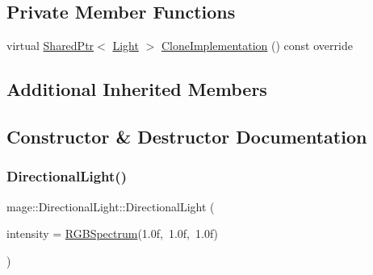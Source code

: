 \subsection*{Private Member Functions}
\begin{DoxyCompactItemize}
\item 
virtual \hyperlink{namespacemage_a1e01ae66713838a7a67d30e44c67703e}{Shared\+Ptr}$<$ \hyperlink{classmage_1_1_light}{Light} $>$ \hyperlink{classmage_1_1_directional_light_a4745c6c9424a427d5d1efaf8530cbb63}{Clone\+Implementation} () const override
\end{DoxyCompactItemize}
\subsection*{Additional Inherited Members}


\subsection{Constructor \& Destructor Documentation}
\hypertarget{classmage_1_1_directional_light_a67df04219f61a8350045e5743b1de284}{}\label{classmage_1_1_directional_light_a67df04219f61a8350045e5743b1de284} 
\subsubsection{\texorpdfstring{Directional\+Light()}{DirectionalLight()}\hspace{0.1cm}{\footnotesize\ttfamily [1/3]}}
{\footnotesize\ttfamily mage\+::\+Directional\+Light\+::\+Directional\+Light (\begin{DoxyParamCaption}\item[{const \hyperlink{structmage_1_1_r_g_b_spectrum}{R\+G\+B\+Spectrum} \&}]{intensity = {\ttfamily \hyperlink{structmage_1_1_r_g_b_spectrum}{R\+G\+B\+Spectrum}(1.0f,~1.0f,~1.0f)} }\end{DoxyParamCaption})\hspace{0.3cm}{\ttfamily [explicit]}}

\hypertarget{classmage_1_1_directional_light_a6939817ef5aeb6347d6d1aa963241f49}{}\label{classmage_1_1_directional_light_a6939817ef5aeb6347d6d1aa963241f49} 

